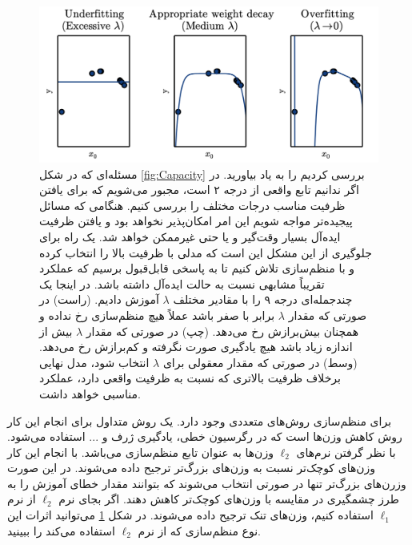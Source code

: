 \begin{figure}
    \centering
    \includegraphics[width=\textwidth]{figs/Regularization.png}
    \caption{ مسئله‌‌ای که در شکل \ref{fig:Capacity} بررسی کردیم را به یاد بیاورید. در اگر ندانیم تابع واقعی از درجه ۲ است، مجبور می‌شویم که برای یافتن ظرفیت مناسب درجات مختلف را بررسی کنیم. هنگامی که مسائل پیجیده‌تر مواجه شویم این امر امکان‌پذیر نخواهد بود و یافتن ظرفیت ایده‌آل بسیار وقت‌گیر و یا حتی غیرممکن خواهد شد. یک راه برای جلوگیری از این مشکل این است که مدلی با ظرفیت بالا را انتخاب کرده و با منظم‌سازی تلاش کنیم تا به پاسخی قابل‌قبول برسیم که عملکرد تقریباً مشابهی نسبت به حالت ایده‌آل داشته باشد. در اینجا یک چندجمله‌ای درجه ۹ را با مقادیر مختلف $\lambda$ آموزش دادیم. (راست) در صورتی که مقدار $\lambda$ برابر با صفر باشد عملاً هیچ منظم‌سازی رخ نداده و همچنان بیش‌برازش رخ می‌دهد. (چپ) در صورتی که مقدار $\lambda$ بیش از اندازه زیاد باشد هیچ یادگیری صورت نگرفته و کم‌برازش رخ می‌دهد. (وسط) در صورتی که مقدار معقولی برای $\lambda$ انتخاب شود، مدل نهایی برخلاف ظرفیت بالاتری که نسبت به ظرفیت واقعی دارد، عملکرد مناسبی خواهد داشت.}
    \label{fig:Regularization}
\end{figure}

برای منظم‌سازی روش‌های متعددی وجود دارد. یک روش متداول برای انجام این کار روش کاهش وزن‌ها است که در رگرسیون خطی، یادگیری ژرف و ... استفاده می‌شود. با نظر گرفتن نرم‌های $\ell_2$ وزن‌ها به عنوان تابع منظم‌سازی می‌باشد. با انجام این کار وزن‌های کوچک‌تر نسبت به وزن‌های بزرگ‌تر ترجیح داده می‌شوند. در این صورت وزرن‌های بزرگ‌تر تنها در صورتی انتخاب می‌شوند که بتوانند مقدار خطای آموزش را به طرز چشمگیری در مقایسه با وزن‌های کوچک‌تر کاهش دهند. اگر بجای نرم $\ell_2$ از نرم $\ell_1$ استفاده کنیم، وزن‌های تنک ترجیح داده می‌شوند.
در شکل \ref{fig:Regularization} می‌توانید اثرات این نوع منظم‌سازی که از نرم $\ell_2$ استفاده می‌کند را ببینید. 

